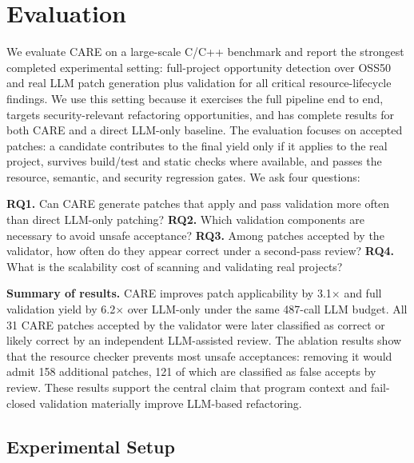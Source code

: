 
\providecommand{\SysName}{CARE}

\section{Evaluation}
\label{sec:evaluation}

We evaluate \SysName{} on a large-scale C/C++ benchmark and report the strongest
completed experimental setting: full-project opportunity detection over OSS50
and real LLM patch generation plus validation for all critical
resource-lifecycle findings. We use this setting because it exercises the full
pipeline end to end, targets security-relevant refactoring opportunities, and
has complete results for both \SysName{} and a direct LLM-only baseline. The
evaluation focuses on accepted patches: a candidate contributes to the final
yield only if it applies to the real project, survives build/test and static
checks where available, and passes the resource, semantic, and security
regression gates. We ask four questions:

\noindent\textbf{RQ1.} Can \SysName{} generate patches that apply and pass
validation more often than direct LLM-only patching?
\textbf{RQ2.} Which validation components are necessary to avoid unsafe
acceptance?
\textbf{RQ3.} Among patches accepted by the validator, how often do they appear
correct under a second-pass review?
\textbf{RQ4.} What is the scalability cost of scanning and validating real
projects?

\noindent\textbf{Summary of results.}
\SysName{} improves patch applicability by 3.1$\times$ and full validation
yield by 6.2$\times$ over LLM-only under the same 487-call LLM budget. All 31
\SysName{} patches accepted by the validator were later classified as correct
or likely correct by an independent LLM-assisted review. The ablation results
show that the resource checker prevents most unsafe acceptances: removing it
would admit 158 additional patches, 121 of which are classified as false
accepts by review. These results support the central claim that program context
and fail-closed validation materially improve LLM-based refactoring.

\subsection{Experimental Setup}
\label{sec:evaluation-setup}

